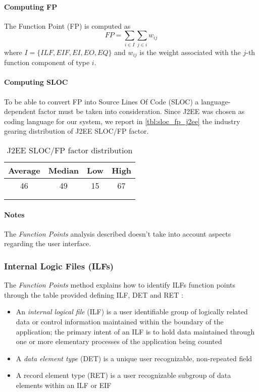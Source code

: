 \paragraph{Computing FP}The Function Point (FP) is computed as
$$ FP = \sum_{i \in I} \sum_{j \in i} w_{ij}$$
where $ I = \{ILF,EIF,EI,EO,EQ\}$ and $w_{ij}$ is the weight associated with the $j$-th function component of type $i$.


\paragraph{Computing SLOC}To be able to convert FP into Source Lines Of Code (SLOC) a language-dependent factor must be taken into consideration. Since J2EE was chosen as coding language for our system, we report in \autoref{tbl:sloc_fp_j2ee} the industry gearing distribution of J2EE SLOC/FP factor. \cite{QSM}

\begin{longtable}{cccc}
\toprule
\textbf{Average} & \textbf{Median} & \textbf{Low} & \textbf{High}\\
\midrule
46 & 49 & 15 & 67\\
\bottomrule \\
\caption{J2EE SLOC/FP factor distribution}
\label{tbl:sloc_fp_j2ee}
\end{longtable}

\paragraph{Notes} The \emph{Function Points} analysis described doesn't take into account aspects regarding the user interface.
\clearpage

\subsubsection{Internal Logic Files (ILFs)}
\label{sec:ILFs}

The \emph{Function Points} method explains how to identify ILFs function points through the table provided defining ILF, DET and RET \cite{FP}:
\begin{itemize}
	\item An \emph{internal logical file} (ILF) is a user identifiable group of logically related data or control information maintained within the boundary of the application; the primary intent of an ILF is to hold data maintained through one or more elementary processes of the application being counted 
	\item A \emph{data element type} (DET) is a unique user recognizable, non-repeated field
	\item A {record element type} (RET) is a user recognizable subgroup of data elements within an ILF or EIF
\end{itemize}

